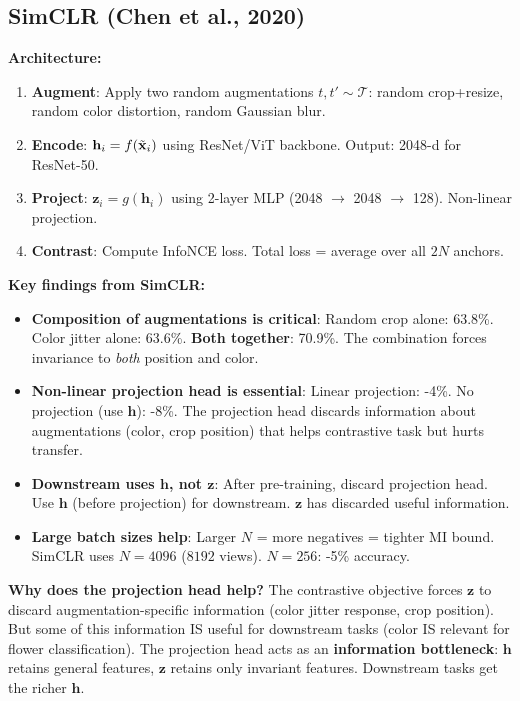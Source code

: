 \subsection{SimCLR (Chen et al., 2020)}

\textbf{Architecture:}
\begin{enumerate}
\item \textbf{Augment}: Apply two random augmentations $t, t' \sim \mathcal{T}$: random crop+resize, random color distortion, random Gaussian blur.
\item \textbf{Encode}: $\mathbf{h}_i = f(\tilde{\mathbf{x}}_i)$ using ResNet/ViT backbone. Output: 2048-d for ResNet-50.
\item \textbf{Project}: $\mathbf{z}_i = g(\mathbf{h}_i)$ using 2-layer MLP (2048 $\to$ 2048 $\to$ 128). Non-linear projection.
\item \textbf{Contrast}: Compute InfoNCE loss. Total loss = average over all $2N$ anchors.
\end{enumerate}

\textbf{Key findings from SimCLR:}
\begin{itemize}
\item \textbf{Composition of augmentations is critical}: Random crop alone: 63.8\%. Color jitter alone: 63.6\%. \textbf{Both together}: 70.9\%. The combination forces invariance to \emph{both} position and color.
\item \textbf{Non-linear projection head is essential}: Linear projection: -4\%. No projection (use $\mathbf{h}$): -8\%. The projection head discards information about augmentations (color, crop position) that helps contrastive task but hurts transfer.
\item \textbf{Downstream uses $\mathbf{h}$, not $\mathbf{z}$}: After pre-training, discard projection head. Use $\mathbf{h}$ (before projection) for downstream. $\mathbf{z}$ has discarded useful information.
\item \textbf{Large batch sizes help}: Larger $N$ = more negatives = tighter MI bound. SimCLR uses $N{=}4096$ ($8192$ views). $N{=}256$: -5\% accuracy.
\end{itemize}

\textbf{Why does the projection head help?}
The contrastive objective forces $\mathbf{z}$ to discard augmentation-specific information (color jitter response, crop position). But some of this information IS useful for downstream tasks (color IS relevant for flower classification). The projection head acts as an \textbf{information bottleneck}: $\mathbf{h}$ retains general features, $\mathbf{z}$ retains only invariant features. Downstream tasks get the richer $\mathbf{h}$.

